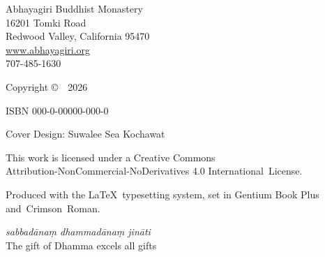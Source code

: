 
\cleartoverso
\thispagestyle{empty}

{\copyrightsize
\centering
\setlength{\parindent}{0pt}%
\setlength{\parskip}{0.8\baselineskip}%


Abhayagiri Buddhist Monastery\\
16201 Tomki Road\\
Redwood Valley, California 95470\\
\href{http://www.abhayagiri.org}{www.abhayagiri.org}\\
707-485-1630

Copyright \copyright\ \thePublisher\ 2026

ISBN 000-0-00000-000-0

Cover Design: Suwalee Sea Kochawat


\vfill

{\footnotesize


This work is licensed under a Creative Commons\\
Attribution-NonCommercial-NoDerivatives 4.0 International~License.


Produced with the \LaTeX\ typesetting system, set in Gentium Book Plus \mbox{and Crimson Roman.}

\theEditionInfo

\vspace{1\baselineskip}

\emph{sabbadānaṃ dhammadānaṃ jināti}\\
The gift of Dhamma excels all gifts

}}